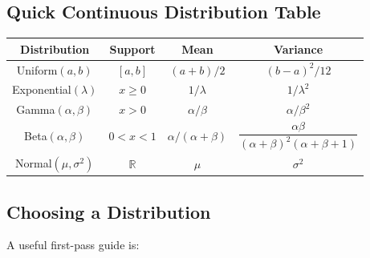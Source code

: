 \subsection{Quick Continuous Distribution Table}
\label{subsec:quick-continuous-distribution-table}

\begin{center}
\begin{tabular}{c|c|c|c}
\textbf{Distribution}
&
\textbf{Support}
&
\textbf{Mean}
&
\textbf{Variance}
\\ \hline

Uniform\((a,b)\)
&
\([a,b]\)
&
\((a+b)/2\)
&
\((b-a)^2/12\)
\\

Exponential\((\lambda)\)
&
\(x\geq0\)
&
\(1/\lambda\)
&
\(1/\lambda^2\)
\\

Gamma\((\alpha,\beta)\)
&
\(x>0\)
&
\(\alpha/\beta\)
&
\(\alpha/\beta^2\)
\\

Beta\((\alpha,\beta)\)
&
\(0<x<1\)
&
\(\alpha/(\alpha+\beta)\)
&
\(\dfrac{\alpha\beta}{(\alpha+\beta)^2(\alpha+\beta+1)}\)
\\

Normal\((\mu,\sigma^2)\)
&
\(\mathbb{R}\)
&
\(\mu\)
&
\(\sigma^2\)
\end{tabular}
\end{center}

\subsection{Choosing a Distribution}
\label{subsec:choosing-probability-distribution}

A useful first-pass guide is:

